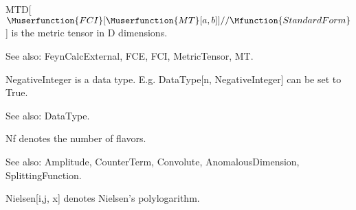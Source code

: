 




MTD[\(\Muserfunction{FCI}[\Muserfunction{MT}[a,b]]//\Mfunction{StandardForm}\)] is the metric tensor in D dimensions.

See also:  FeynCalcExternal, FCE, FCI, MetricTensor, MT.





\dispSFoutmath{
\mu ,\multsp \nu
}









NegativeInteger is a data type. E.g. DataType[n, NegativeInteger] can be set to True.

See also:  DataType.



Nf denotes the number of flavors.

See also:  Amplitude, CounterTerm, Convolute, AnomalousDimension, SplittingFunction.



Nielsen[i,j, x] denotes Nielsen's polylogarithm.

